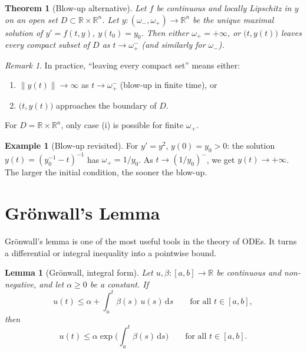 \documentclass[12pt,a4paper,openany]{book}
\theoremstyle{definition}
\newtheorem{example}[definition]{Example}
\theoremstyle{plain}
\newtheorem{theorem}[definition]{Theorem}
\newtheorem{lemma}[definition]{Lemma}
\theoremstyle{remark}
\newtheorem{remark}[definition]{Remark}
\newcommand{\R}{\mathbb{R}}
\newcommand{\dd}{\mathrm{d}}
\newcommand{\norm}[1]{\left\|#1\right\|}
\begin{document}
\begin{theorem}[Blow-up alternative]\label{thm:blowup-alternative}
Let $f$ be continuous and locally Lipschitz in $y$ on an open set
$D \subset \R \times \R^n$. Let $y\colon (\omega_-, \omega_+) \to \R^n$ be
the unique maximal solution of $y' = f(t,y)$, $y(t_0) = y_0$. Then either
$\omega_+ = +\infty$, or $\bigl(t, y(t)\bigr)$ leaves every compact subset
of $D$ as $t \to \omega_+^-$ (and similarly for $\omega_-$).
\end{theorem}

\begin{remark}\label{rem:blowup-cases}
In practice, ``leaving every compact set'' means either:
\begin{enumerate}[label=(\roman*)]
  \item $\norm{y(t)} \to \infty$ as $t \to \omega_+^-$ (blow-up in finite time), or
  \item $\bigl(t, y(t)\bigr)$ approaches the boundary of $D$.
\end{enumerate}
For $D = \R \times \R^n$, only case (i) is possible for finite $\omega_+$.
\end{remark}

\begin{example}[Blow-up revisited]\label{ex:blowup-revisited}
For $y' = y^2$, $y(0) = y_0 > 0$: the solution $y(t) = (y_0^{-1} - t)^{-1}$
has $\omega_+ = 1/y_0$. As $t \to (1/y_0)^-$, we get $y(t) \to +\infty$.
The larger the initial condition, the sooner the blow-up.
\end{example}

\section{Gr\"onwall's Lemma}\label{sec:gronwall}

Gr\"onwall's lemma is one of the most useful tools in the theory of ODEs.
It turns a differential or integral inequality into a pointwise bound.

\begin{lemma}[Gr\"onwall, integral form]\label{lem:gronwall}
Let $u, \beta\colon [a,b] \to \R$ be continuous and non-negative, and let
$\alpha \ge 0$ be a constant. If
\begin{equation}\label{eq:gronwall-hyp}
  u(t) \le \alpha + \int_a^t \beta(s)\,u(s)\,\dd s
  \qquad \text{for all } t \in [a,b],
\end{equation}
then
\begin{equation}\label{eq:gronwall-concl}
  u(t) \le \alpha \exp\!\biggl(\int_a^t \beta(s)\,\dd s\biggr)
  \qquad \text{for all } t \in [a,b].
\end{equation}
\end{lemma}
\end{document}
